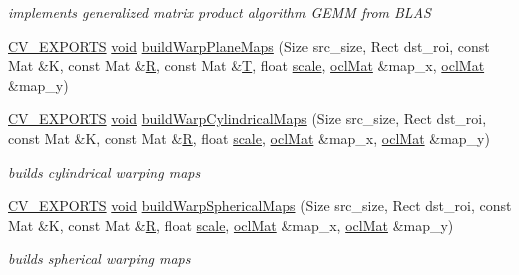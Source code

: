 \begin{DoxyCompactItemize}
\begin{DoxyCompactList}\small\item\em implements generalized matrix product algorithm G\-E\-M\-M from B\-L\-A\-S \end{DoxyCompactList}\item 
\hyperlink{core_2types__c_8h_a1bf9f0e121b54272da02379cfccd0a2b}{C\-V\-\_\-\-E\-X\-P\-O\-R\-T\-S} \hyperlink{legacy_8hpp_a8bb47f092d473522721002c86c13b94e}{void} \hyperlink{namespacecv_1_1ocl_a35690467e329fb4e8a985ed6f37155e3}{build\-Warp\-Plane\-Maps} (Size src\-\_\-size, Rect dst\-\_\-roi, const Mat \&K, const Mat \&\hyperlink{imgproc__c_8h_a51837f120208319f026dc8c4a71e56e0}{R}, const Mat \&\hyperlink{calib3d_8hpp_a3efb9551a871ddd0463079a808916717}{T}, float \hyperlink{objdetect_8hpp_a1f622eb9b9e06b30862ca90cdf2c078b}{scale}, \hyperlink{classcv_1_1ocl_1_1oclMat}{ocl\-Mat} \&map\-\_\-x, \hyperlink{classcv_1_1ocl_1_1oclMat}{ocl\-Mat} \&map\-\_\-y)
\item 
\hyperlink{core_2types__c_8h_a1bf9f0e121b54272da02379cfccd0a2b}{C\-V\-\_\-\-E\-X\-P\-O\-R\-T\-S} \hyperlink{legacy_8hpp_a8bb47f092d473522721002c86c13b94e}{void} \hyperlink{namespacecv_1_1ocl_af75bd6b3c4c5afed0f296068fa84598b}{build\-Warp\-Cylindrical\-Maps} (Size src\-\_\-size, Rect dst\-\_\-roi, const Mat \&K, const Mat \&\hyperlink{imgproc__c_8h_a51837f120208319f026dc8c4a71e56e0}{R}, float \hyperlink{objdetect_8hpp_a1f622eb9b9e06b30862ca90cdf2c078b}{scale}, \hyperlink{classcv_1_1ocl_1_1oclMat}{ocl\-Mat} \&map\-\_\-x, \hyperlink{classcv_1_1ocl_1_1oclMat}{ocl\-Mat} \&map\-\_\-y)
\begin{DoxyCompactList}\small\item\em builds cylindrical warping maps \end{DoxyCompactList}\item 
\hyperlink{core_2types__c_8h_a1bf9f0e121b54272da02379cfccd0a2b}{C\-V\-\_\-\-E\-X\-P\-O\-R\-T\-S} \hyperlink{legacy_8hpp_a8bb47f092d473522721002c86c13b94e}{void} \hyperlink{namespacecv_1_1ocl_a1bfb06ce0432bde41356000d90260fd0}{build\-Warp\-Spherical\-Maps} (Size src\-\_\-size, Rect dst\-\_\-roi, const Mat \&K, const Mat \&\hyperlink{imgproc__c_8h_a51837f120208319f026dc8c4a71e56e0}{R}, float \hyperlink{objdetect_8hpp_a1f622eb9b9e06b30862ca90cdf2c078b}{scale}, \hyperlink{classcv_1_1ocl_1_1oclMat}{ocl\-Mat} \&map\-\_\-x, \hyperlink{classcv_1_1ocl_1_1oclMat}{ocl\-Mat} \&map\-\_\-y)
\begin{DoxyCompactList}\small\item\em builds spherical warping maps \end{DoxyCompactList}\item 

\end{DoxyCompactItemize}
